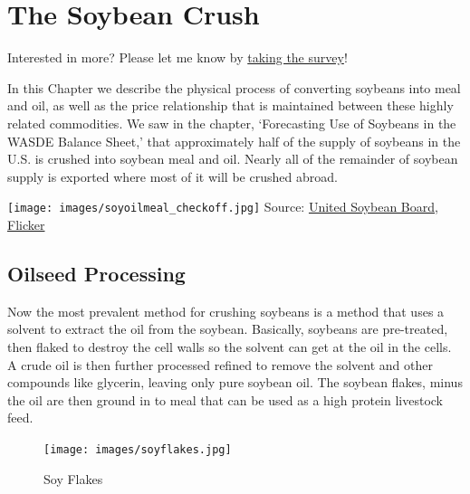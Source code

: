 \documentclass[
  letterpaper,
  DIV=11,
  numbers=noendperiod]{scrreprt}
\begin{document}

\chapter{The Soybean Crush}\label{the-soybean-crush}

{Interested in more? Please let me know by}
\href{https://forms.gle/Q3VByCQZHjfQSy9D7}{taking the survey}!

In this Chapter we describe the physical process of converting soybeans
into meal and oil, as well as the price relationship that is maintained
between these highly related commodities. We saw in the chapter,
`Forecasting Use of Soybeans in the WASDE Balance Sheet,' that
approximately half of the supply of soybeans in the U.S. is crushed into
soybean meal and oil. Nearly all of the remainder of soybean supply is
exported where most of it will be crushed abroad.

\texttt{[image: images/soyoilmeal\_checkoff.jpg]} Source:
\href{http://unitedsoybean.org/}{United Soybean Board},
\href{https://www.flickr.com/photos/unitedsoybean/10059732523/in/photolist-gjWL1c-iSHsD6-gjRZN5-gjSiez-gjRDSm-3GTus-gjT5Pf-gjT5FQ-gjT5Zf-iRrGux-5mxrJp-iRuCDS-fEhEb4-iSHt56-gjSLAj-gjTptX-gjSLDL-gjSNeR-gjSLEC-gjT72q-6m2BCX-gjSUHT-gjTpzi-6m6Jay-qBtpPq-5wBq3U-gjWLbe-aMpXNc-qRDdLA-gjWY8m-rujuvk-iRqECD-rNDaeg-GL7Qd-6m2Yyc-6JGi4H-ar3khU-cNjfUf-6m2A3g-aE4dw4-c3VUt9-c3VVq5-4JzMWS-6KY45z-6m2Xsv-6m6Eny-6m2XZg-6m2WVa-6m2ZFF-6m7ad1}{Flicker}

\section{Oilseed Processing}\label{oilseed-processing}

Now the most prevalent method for crushing soybeans is a method that
uses a solvent to extract the oil from the soybean. Basically, soybeans
are pre-treated, then flaked to destroy the cell walls so the solvent
can get at the oil in the cells. A crude oil is then further processed
refined to remove the solvent and other compounds like glycerin, leaving
only pure soybean oil. The soybean flakes, minus the oil are then ground
in to meal that can be used as a high protein livestock feed.

\begin{figure}[H]

{\centering \texttt{[image: images/soyflakes.jpg]}

}

\caption{Soy Flakes}

\end{figure}%
\end{document}
